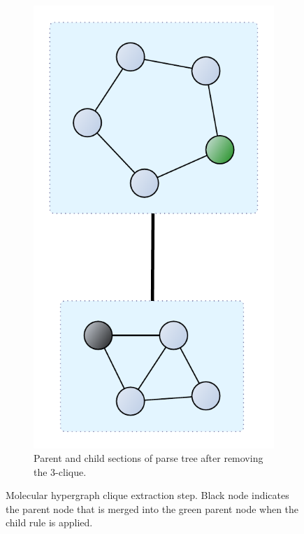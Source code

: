 \documentclass{article}
\begin{document}
\begin{figure}
\begin{subfigure}[b]{0.48\textwidth}
        \includegraphics[scale=0.2]{images/mols_clique_collapsed.pdf}
        \caption{Parent and child sections of parse tree after removing the 3-clique.}
    \end{subfigure}
    \caption{Molecular hypergraph clique extraction step. Black node indicates the parent node that is merged into the green parent node when the child rule is applied.}
    \label{fig:cliquecollapse}
\end{figure}
\end{document}
